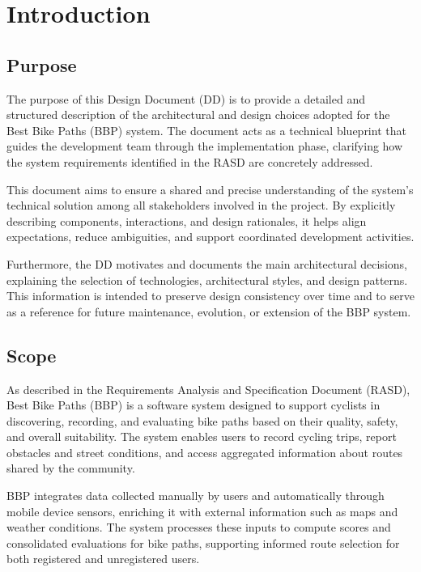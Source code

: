\chapter{Introduction}
\label{ch:Introduction}%

\section{Purpose}
\label{sec:Purpose}%

\par The purpose of this Design Document (DD) is to provide a detailed and structured
description of the architectural and design choices adopted for the Best Bike Paths (BBP)
system. The document acts as a technical blueprint that guides the development team
through the implementation phase, clarifying how the system requirements identified in
the RASD are concretely addressed.

\par This document aims to ensure a shared and precise understanding of the system’s
technical solution among all stakeholders involved in the project. By explicitly describing
components, interactions, and design rationales, it helps align expectations, reduce
ambiguities, and support coordinated development activities.

\par Furthermore, the DD motivates and documents the main architectural decisions,
explaining the selection of technologies, architectural styles, and design patterns.
This information is intended to preserve design consistency over time and to serve as a
reference for future maintenance, evolution, or extension of the BBP system.

\section{Scope}
\label{sec:Scope}%

\par As described in the Requirements Analysis and Specification Document (RASD),
Best Bike Paths (BBP) is a software system designed to support cyclists in discovering,
recording, and evaluating bike paths based on their quality, safety, and overall suitability.
The system enables users to record cycling trips, report obstacles and street conditions,
and access aggregated information about routes shared by the community.

\par BBP integrates data collected manually by users and automatically through mobile
device sensors, enriching it with external information such as maps and weather conditions.
The system processes these inputs to compute scores and consolidated evaluations for bike
paths, supporting informed route selection for both registered and unregistered users.

